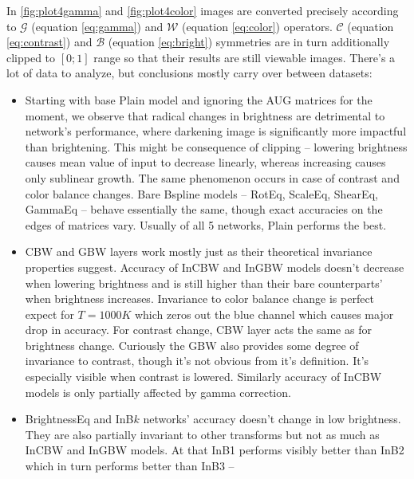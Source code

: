     In \ref{fig:plot4gamma} and \ref{fig:plot4color} images are converted
    precisely according to $\mathcal{G}$ (equation \ref{eq:gamma})
    and $\mathcal{W}$ (equation \ref{eq:color}) operators. $\mathcal{C}$
    (equation \ref{eq:contrast})
    and $\mathcal{B}$ (equation \ref{eq:bright}) symmetries are in turn additionally
    clipped to $[0;1]$ range so that their results are still viewable images.
    There's a lot of data to analyze, but conclusions mostly carry over between
    datasets:

    \begin{itemize}
    \item Starting with base Plain model and ignoring the AUG matrices
        for the moment, we observe that radical changes in brightness
        are detrimental to network's performance, where darkening image
        is significantly
        more impactful than brightening.
        This might be consequence of clipping -- lowering
        brightness causes mean value of input to decrease linearly,
        whereas increasing
        causes only sublinear growth. The same phenomenon occurs in case of contrast and
        color balance changes. Bare Bspline models -- RotEq, ScaleEq, ShearEq,
        GammaEq -- behave essentially the same, though exact accuracies
        on the edges of matrices vary.
        Usually of all 5 networks, Plain performs the best.
    \item CBW and GBW layers work mostly
        just as their theoretical
        invariance properties suggest. Accuracy of InCBW and InGBW models
        doesn't decrease
        when lowering brightness and is still higher than their bare
        counterparts' when brightness increases.
        Invariance to color balance
        change is perfect expect for $T=1000K$ which zeros out the blue
        channel which causes major drop in accuracy. For contrast change, CBW
        layer acts the same as for brightness change. Curiously the
        GBW also provides some degree of invariance to contrast, though it's
        not obvious from it's definition. It's
        especially visible when contrast is lowered. Similarly accuracy of InCBW
        models is only partially affected by gamma correction.
    \item BrightnessEq and InB$k$ networks' accuracy doesn't change in low
        brightness. They are also partially invariant to other transforms
        but not as much as InCBW and InGBW models. At that InB1 performs visibly
        better than InB2 which in turn performs better than InB3 --

\end{itemize}
